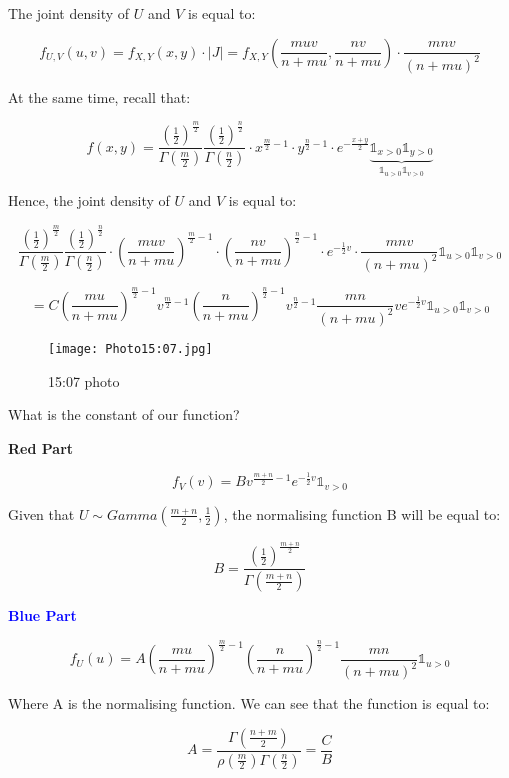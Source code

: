 The joint density of $U$ and $V$ is equal to:

\[
f_{U,V}(u,v) = f_{X,Y}(x,y) \cdot |J| = f_{X,Y}(\frac{muv}{n+mu}, \frac{nv}{n+mu}) \cdot \frac{mnv}{(n+mu)^2}
\]

At the same time, recall that:

\[
f(x,y) = \frac{(\frac{1}{2})^{\frac{m}{2}}}{\Gamma (\frac{m}{2})} \frac{(\frac{1}{2})^{\frac{n}{2}}}{\Gamma (\frac{n}{2})} \cdot x^{\frac{m}{2}-1} \cdot y^{\frac{n}{2}-1} \cdot e^{-\frac{x+y}{2}} \underbrace{\mathbb{1}_{x>0} \mathbb{1}_{y>0}}_{\mathbb{1}_{u>0} \mathbb{1}_{v>0}}
\]

Hence, the joint density of $U$ and $V$ is equal to:

\[
\frac{(\frac{1}{2})^{\frac{m}{2}}}{\Gamma (\frac{m}{2})} \frac{(\frac{1}{2})^{\frac{n}{2}}}{\Gamma (\frac{n}{2})} \cdot (\frac{muv}{n+mu})^{\frac{m}{2}-1} \cdot (\frac{nv}{n+mu})^{\frac{n}{2}-1} \cdot e^{-\frac{1}{2}v} \cdot \frac{mnv}{(n+mu)^2} \mathbb{1}_{u>0} \mathbb{1}_{v>0}
\]

\[
 = C \left( \frac{mu}{n+mu} \right)^{\frac{m}{2}-1} v^{\frac{m}{2}-1} \left( \frac{n}{n+mu} \right)^{\frac{n}{2}-1} v^{\frac{n}{2}-1} \frac{mn}{(n+mu)^2} ve^{-\frac{1}{2}v} \mathbb{1}_{u>0} \mathbb{1}_{v>0}
\]

\begin{figure}
    \centering
    \texttt{[image: Photo15:07.jpg]}
    \caption{15:07 photo}
    \label{fig:15_07}
\end{figure}
What is the constant of our function?

\noindent
\textbf{\textcolor{BrickRed}{Red Part}}

\[
f_V (v) = B v ^{\frac{m+n}{2}-1} e^{-\frac{1}{2}v} \mathbb{1}_{v>0}
\]

Given that \( U \sim Gamma (\frac{m+n}{2}, \frac{1}{2}) \), the normalising function B will be equal to:

\[ B = \frac{\left(\frac{1}{2}\right)^{\frac{m+n}{2}}}{\Gamma \left( \frac{m+n}{2} \right)} \]

\noindent
\textbf{\textcolor{blue}{Blue Part}}

\[
f_U (u) = A \left( \frac{mu}{n+mu} \right)^{\frac{m}{2}-1} \left( \frac{n}{n+mu} \right)^{\frac{n}{2}-1} \frac{mn}{(n+mu)^2}  \mathbb{1}_{u>0}
\]

Where A is the normalising function. We can see that the function is equal to:

\[
A = \frac{\Gamma \left( \frac{n+m}{2} \right)}{\rho \left( \frac{m}{2} \right) \Gamma \left( \frac{n}{2} \right)} = \frac{C}{B}
\]

